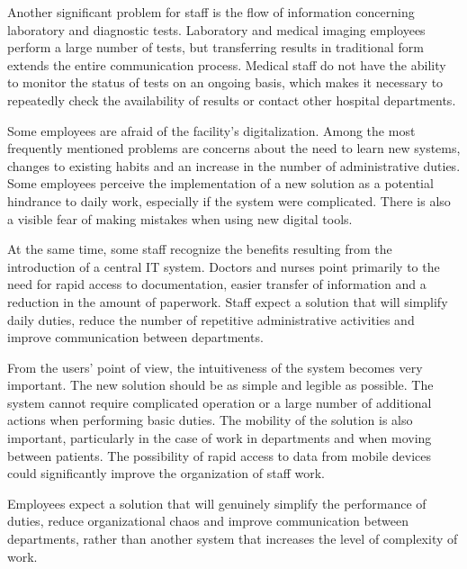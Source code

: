 Another significant problem for staff is the flow of information concerning laboratory and diagnostic tests. Laboratory and medical imaging employees perform a large number of tests, but transferring results in traditional form extends the entire communication process. Medical staff do not have the ability to monitor the status of tests on an ongoing basis, which makes it necessary to repeatedly check the availability of results or contact other hospital departments.

Some employees are afraid of the facility's digitalization. Among the most frequently mentioned problems are concerns about the need to learn new systems, changes to existing habits and an increase in the number of administrative duties. Some employees perceive the implementation of a new solution as a potential hindrance to daily work, especially if the system were complicated. There is also a visible fear of making mistakes when using new digital tools.

At the same time, some staff recognize the benefits resulting from the introduction of a central IT system. Doctors and nurses point primarily to the need for rapid access to documentation, easier transfer of information and a reduction in the amount of paperwork. Staff expect a solution that will simplify daily duties, reduce the number of repetitive administrative activities and improve communication between departments.

From the users' point of view, the intuitiveness of the system becomes very important. The new solution should be as simple and legible as possible. The system cannot require complicated operation or a large number of additional actions when performing basic duties. The mobility of the solution is also important, particularly in the case of work in departments and when moving between patients. The possibility of rapid access to data from mobile devices could significantly improve the organization of staff work.

Employees expect a solution that will genuinely simplify the performance of duties, reduce organizational chaos and improve communication between departments, rather than another system that increases the level of complexity of work.
